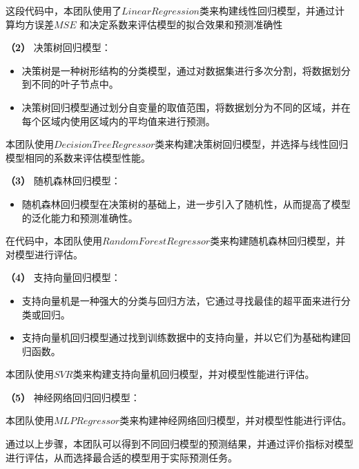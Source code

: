 \documentclass[withoutpreface,bwprint]{cumcmthesis}
\begin{document}
这段代码中，本团队使用了\(LinearRegression\)类来构建线性回归模型，并通过计算均方误差\(MSE\) 和决定系数来评估模型的拟合效果和预测准确性

\textbf{（2）} 决策树回归模型：

\begin{itemize}
    \item 决策树是一种树形结构的分类模型，通过对数据集进行多次分割，将数据划分到不同的叶子节点中。
    
    \item 决策树回归模型通过划分自变量的取值范围，将数据划分为不同的区域，并在每个区域内使用区域内的平均值来进行预测。
    
\end{itemize}

本团队使用\(DecisionTreeRegressor\)类来构建决策树回归模型，并选择与线性回归模型相同的系数来评估模型性能。


\textbf{（3）} 随机森林回归模型：

\begin{itemize}

    \item 随机森林回归模型在决策树的基础上，进一步引入了随机性，从而提高了模型的泛化能力和预测准确性。
    
\end{itemize}

在代码中，本团队使用\(RandomForestRegressor\)类来构建随机森林回归模型，并对模型进行评估。

\textbf{（4）} 支持向量回归模型：

\begin{itemize}
    \item 支持向量机是一种强大的分类与回归方法，它通过寻找最佳的超平面来进行分类或回归。
    
    \item 支持向量机回归模型通过找到训练数据中的支持向量，并以它们为基础构建回归函数。
    
\end{itemize}

本团队使用\(SVR\)类来构建支持向量机回归模型，并对模型性能进行评估。

\textbf{（5）} 神经网络回归回归模型：

 本团队使用\(MLPRegressor\)类来构建神经网络回归模型，并对模型性能进行评估。


通过以上步骤，本团队可以得到不同回归模型的预测结果，并通过评价指标对模型进行评估，从而选择最合适的模型用于实际预测任务。

\end{document}
